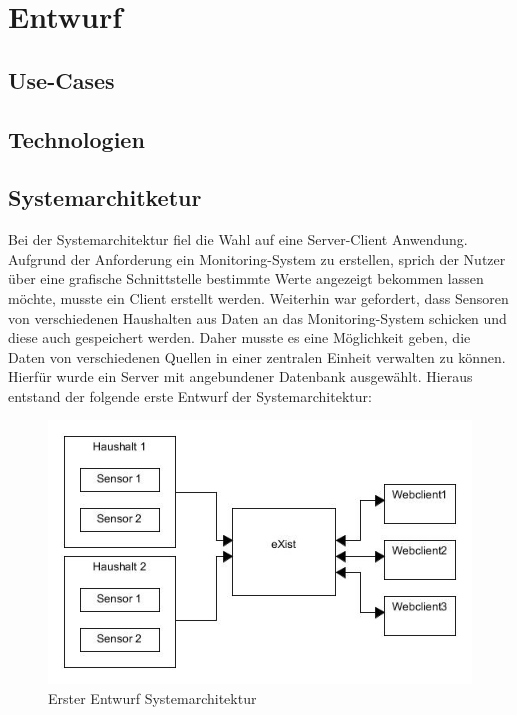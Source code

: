 \section{Entwurf}

\subsection{Use-Cases}

\subsection{Technologien}


\subsection{Systemarchitketur}
Bei der Systemarchitektur fiel die Wahl auf eine Server-Client Anwendung. Aufgrund der Anforderung ein Monitoring-System zu erstellen, sprich der Nutzer über eine grafische Schnittstelle bestimmte Werte angezeigt bekommen lassen möchte, musste ein Client erstellt werden. Weiterhin war gefordert, dass Sensoren von verschiedenen Haushalten aus Daten an das Monitoring-System schicken und diese auch gespeichert werden. Daher musste es eine Möglichkeit geben, die Daten von verschiedenen Quellen in einer zentralen Einheit verwalten zu können. Hierfür wurde ein Server mit angebundener Datenbank ausgewählt. Hieraus entstand der folgende erste Entwurf der Systemarchitektur:

\begin{figure}[h]
\begin{center}
\includegraphics[scale=0.7]{images/sa1.jpg} 
\caption{Erster Entwurf Systemarchitektur}
\end{center}
\end{figure}

